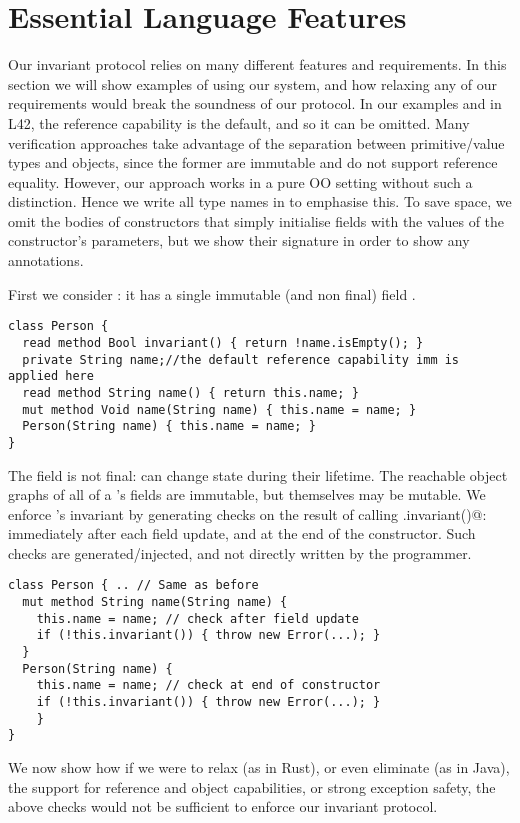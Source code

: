\section{Essential Language Features}
\label{s:immutable}
Our invariant protocol relies on many different features and requirements. In this section 
we will show examples of using our system, and how relaxing any of our requirements would break the soundness of our protocol.
In our examples and in L42, the reference capability \Q@imm@ is the default, and so it can be omitted.
Many verification approaches take advantage of the separation between primitive/value types and objects, since the former are immutable and do not support reference equality.
However, our approach works in a pure OO setting without such a distinction. Hence we write all type names in \Q@BoldTitleCase@ to emphasise this. 
To save space, we omit the bodies of constructors that simply initialise fields with the values of the constructor's parameters, but we show their signature in order to show any annotations.

First we consider
\Q@Person@: it has a single immutable (and non final) field \Q@name@.
\begin{lstlisting}
class Person {
  read method Bool invariant() { return !name.isEmpty(); }
  private String name;//the default reference capability imm is applied here
  read method String name() { return this.name; }
  mut method Void name(String name) { this.name = name; }
  Person(String name) { this.name = name; }
}
\end{lstlisting}
The \Q@name@ field is not final: \Q@Person@s can change state during their lifetime. The reachable object graphs of all of a \Q@Person@'s fields are immutable, but \Q@Person@s themselves may be mutable.
We enforce \Q@Person@'s invariant by generating checks on the result of calling \Q@this.invariant()@: immediately after each field update, and at the end of the constructor.
Such checks are generated/injected, and not directly written by the programmer.
\begin{lstlisting}
class Person { .. // Same as before
  mut method String name(String name) {
    this.name = name; // check after field update
    if (!this.invariant()) { throw new Error(...); }
  }
  Person(String name) {
    this.name = name; // check at end of constructor
    if (!this.invariant()) { throw new Error(...); }
    }
}
\end{lstlisting}
We now show how if we were to relax (as in Rust), or even eliminate (as in Java), the support for reference and object capabilities, or strong exception safety, the above checks would not be sufficient to enforce our invariant protocol.

